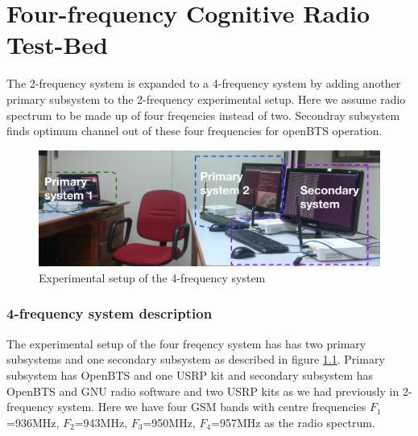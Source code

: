 \chapter{Four-frequency Cognitive Radio Test-Bed}

The 2-frequency system is expanded to a 4-frequency system by adding 
another primary subsystem to the 2-frequency experimental setup. Here we 
assume radio spectrum to be made up of four freqencies
instead of two. Secondray subsystem finds optimum channel out of 
these four frequencies for openBTS operation.
\begin{figure}
\centering
\includegraphics[width=1\textwidth]{../images/freq4}
\caption[Experimental setup, 4-frequency system]{Experimental setup of the 
4-frequency system}
\label{freq4}
\end{figure}

\subsection{4-frequency system description}
 The experimental setup of the four freqency system has 
has two primary subsystems and one secondary subsystem as described
in figure \ref{freq4}. Primary subsystem 
has OpenBTS and one USRP kit and secondary subsystem has OpenBTS and GNU radio 
software and two USRP kits as we had previously in 2-frequency system. 
Here we have four GSM bands with centre frequencies 
$F_1$=936MHz, $F_2$=943MHz, $F_3$=950MHz, $F_4$=957MHz as the radio spectrum.
 



